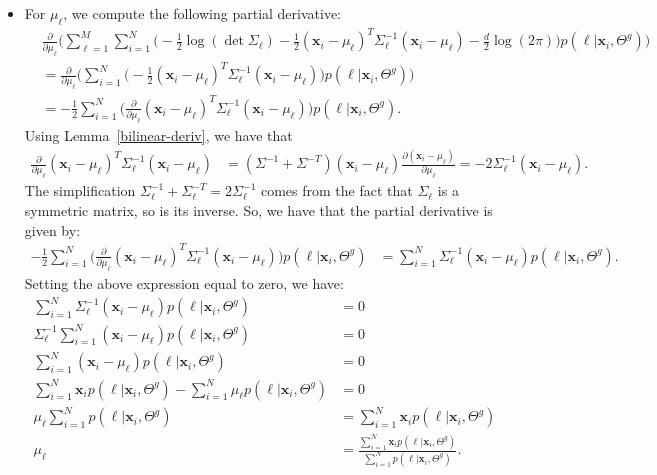 \documentclass[10pt]{article}
\newcommand{\x}{\mathbf{x}}
\begin{document}
\begin{itemize}
    \item For $\mu_\ell$, we compute the following partial derivative:
    \begin{align*}
      & \frac{\partial}{\partial \mu_\ell} \bigg( \sum_{\ell=1}^M \sum_{i=1}^N \bigg( -\frac{1}{2} \log(\det \Sigma_\ell) - \frac{1}{2} (\x_i - \mu_\ell)^T \Sigma_\ell^{-1} (\x_i - \mu_\ell) - \frac{d}{2}\log(2\pi) \bigg)p(\ell|\x_i,\Theta^g) \bigg) \\
      &= \frac{\partial}{\partial \mu_\ell} \bigg( \sum_{i=1}^N \bigg( - \frac{1}{2} (\x_i - \mu_\ell)^T \Sigma_\ell^{-1} (\x_i - \mu_\ell)  \bigg)p(\ell|\x_i,\Theta^g) \bigg)\\
      &= - \frac{1}{2} \sum_{i=1}^N \bigg( \frac{\partial}{\partial \mu_\ell} (\x_i - \mu_\ell)^T \Sigma_\ell^{-1} (\x_i - \mu_\ell) \bigg) p(\ell|\x_i,\Theta^g).
    \end{align*}
    Using Lemma~\ref{bilinear-deriv}, we have that
    \begin{align*}
      \frac{\partial}{\partial \mu_\ell} (\x_i - \mu_\ell)^T \Sigma_\ell^{-1} (\x_i - \mu_\ell)
      &= (\Sigma^{-1} + \Sigma^{-T})(\x_i - \mu_\ell) \frac{\partial(\x_i - \mu_\ell)}{\partial \mu_\ell} = -2\Sigma_\ell^{-1}(\x_i - \mu_\ell).
    \end{align*}
    The simplification $\Sigma_\ell^{-1} + \Sigma_\ell^{-T} = 2\Sigma_\ell^{-1}$ comes from the fact that $\Sigma_\ell$ is a symmetric matrix, so is its inverse. So, we have that the partial derivative is given by:
    \begin{align*}
      - \frac{1}{2} \sum_{i=1}^N \bigg( \frac{\partial}{\partial \mu_\ell} (\x_i - \mu_\ell)^T \Sigma_\ell^{-1} (\x_i - \mu_\ell) \bigg) p(\ell|\x_i,\Theta^g)
      &= \sum_{i=1}^N \Sigma_\ell^{-1}(\x_i - \mu_\ell) p(\ell|\x_i,\Theta^g).
    \end{align*}
    Setting the above expression equal to zero, we have:
    \begin{align*}
      \sum_{i=1}^N \Sigma_\ell^{-1}(\x_i - \mu_\ell) p(\ell|\x_i,\Theta^g) &= 0\\
      \Sigma_\ell^{-1} \sum_{i=1}^N (\x_i - \mu_\ell) p(\ell|\x_i,\Theta^g) &= 0\\
      \sum_{i=1}^N (\x_i - \mu_\ell) p(\ell|\x_i,\Theta^g) &= 0\\
      \sum_{i=1}^N \x_i p(\ell|\x_i,\Theta^g) - \sum_{i=1}^N  \mu_\ell p(\ell|\x_i,\Theta^g) &= 0\\
      \mu_\ell \sum_{i=1}^N p(\ell|\x_i,\Theta^g) &= \sum_{i=1}^N \x_i p(\ell|\x_i,\Theta^g)\\
      \mu_\ell &= \frac{\sum_{i=1}^N \x_i p(\ell|\x_i,\Theta^g)}{\sum_{i=1}^N   p(\ell|\x_i,\Theta^g)}.
    \end{align*}
    

\end{itemize}
\end{document}
